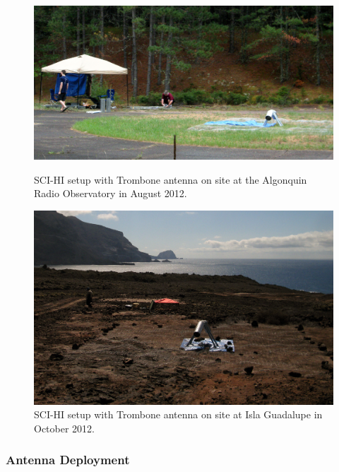 \begin{figure}[htb]
\centering
\begin{minipage}[b]{0.52\textwidth}
\centering
\includegraphics[width=0.95\linewidth]{SCIHI_system/figures/trombone_alg_sys.jpg}
\caption{SCI-HI setup with Trombone antenna on site at the Algonquin Radio Observatory in August 2012.}
\label{Fig:trombone_alg}
\end{minipage}%
\begin{minipage}[b]{0.02\textwidth}
\hspace{1cm}
\end{minipage}%
\begin{minipage}[b]{0.42\textwidth}
\centering
\includegraphics[width=0.95\linewidth]{SCIHI_system/figures/trombone_sys_guad.jpg}
\caption{SCI-HI setup with Trombone antenna on site at Isla Guadalupe in October 2012.}
\label{Fig:trombone_guad}
\end{minipage}
\end{figure}

\subsubsection{Antenna Deployment}

